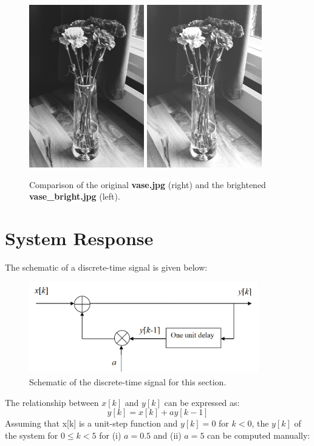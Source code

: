 \documentclass[a4paper, 10pt]{article}
\begin{document}
\begin{figure}[H]
  \centering
  \includegraphics[width=5cm]{images/vase.jpg}
  \includegraphics[width=5cm]{images/vase_bright.jpg}
  \caption{Comparison of the original \textbf{vase.jpg} (right) and the brightened \textbf{vase\_bright.jpg} (left).}
\end{figure}

\section{System Response}
The schematic of a discrete-time signal is given below:
\begin{figure}[H]
  \centering
  \includegraphics[width=10cm]{images/system_schem.png}
  \caption{Schematic of the discrete-time signal for this section.}
\end{figure}
\noindent The relationship between $x[k]$ and $y[k]$ can be expressed as:
\begin{equation}
  y[k] = x[k]+ay[k-1]
\end{equation}
Assuming that x[k] is a unit-step function and $y[k] = 0$ for $k<0$,
the $y[k]$ of the system for $0 \leq k < 5$ for (i) $a=0.5$ and (ii) $a=5$ can
be computed manually:
\end{document}
